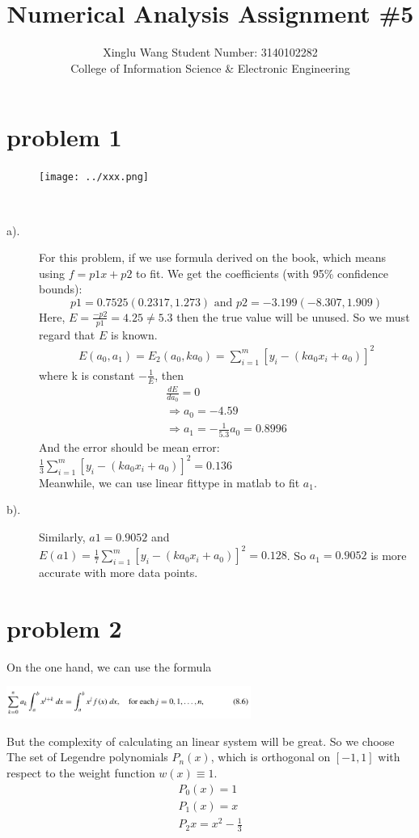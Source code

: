 \documentclass{article}
\title{\textbf{Numerical Analysis Assignment \#5}}
\author{Xinglu Wang \qquad Student Number: 3140102282
    \\ %
    College of Information Science \& Electronic Engineering}
\date{}
\begin{document}
\maketitle
\section{problem 1}
\begin{figure}
  \centering
  \texttt{[image: ../xxx.png]}\\
  \caption{}\label{}
\end{figure}

\begin{description}
\item[a).]
For this problem, if we use formula derived on the book, which means using $f=p1x+p2$ to fit. We get the coefficients (with 95\% confidence bounds):
 \[      p1 =      0.7525  (0.2317, 1.273) \text{  and  }
       p2 =      -3.199  (-8.307, 1.909)\]
Here, $E=\frac{-p2}{p1}=4.25\neq5.3$ then the true value will be unused. So we must regard that $E$ is known.
\[\begin{array}{l}
E({a_0},{a_1}) = {E_2}({a_0},k{a_0})
 = \sum\limits_{i = 1}^m {{{\left[ {{y_i} - (k{a_0}{x_i} + {a_0})} \right]}^2}}
\end{array}\]where k is constant $-\frac{1}{E}$, then
\[\begin{array}{l}
\frac{dE}{d{a_0}} = 0\\
 \Rightarrow {a_0} =  - 4.59\\
 \Rightarrow {a_1} =  - \frac{1}{{5.3}}{a_0} = 0.8996
\end{array}\]
And the error should be mean error:  $\frac{1}{3}\sum\limits_{i = 1}^m {{\left[ {{y_i} - (k{a_0}{x_i} + {a_0})} \right]}^2}=0.136$ \\
Meanwhile, we can use linear fittype in matlab to fit $a_1$.

\item[b).]
Similarly, $a1=0.9052$ and $E(a1)= \frac{1}{7}\sum\limits_{i = 1}^m {{\left[ {{y_i} - (k{a_0}{x_i} + {a_0})} \right]}^2}=0.128$. So $a_1=0.9052$ is more accurate with more data points.
\end{description}
\section{problem 2}
On the one hand, we can use the formula
\begin{center}
\includegraphics[width=8cm]{../pic/p2_1.png}
\end{center}
But the complexity of calculating an linear system will be great. So we choose The set of Legendre polynomials ${P_n (x)}$, which is orthogonal on $[-1,1]$
with respect to the weight function $w(x) \equiv 1$.
\[\begin{array}{l}
{P_0}(x) = 1\\
{P_1}(x) = x\\
{P_2}{x} = x^2-\frac{1}{3}
\end{array}\]
\end{document}
